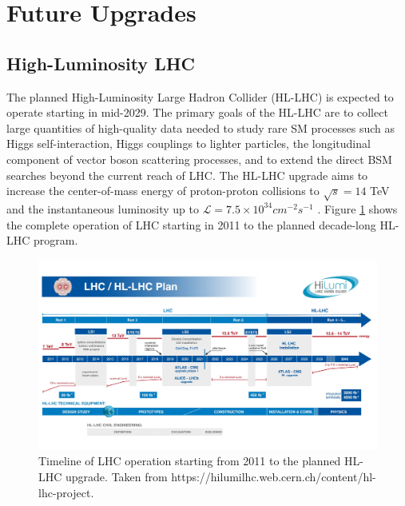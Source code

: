 \section{Future Upgrades}
\label{sec:FutureUpgrades}

\subsection{High-Luminosity LHC}
\label{subsec:HLLHC}
The planned High-Luminosity Large Hadron Collider (HL-LHC) is expected to operate starting in mid-2029. The primary goals of the HL-LHC are to collect large quantities of high-quality data needed to study rare SM processes such as Higgs self-interaction, Higgs couplings to lighter particles, the longitudinal component of vector boson scattering processes, and to extend the direct BSM searches beyond the current reach of LHC. The HL-LHC upgrade aims to increase the center-of-mass energy of proton-proton collisions to $\sqrt{s}=14$ TeV and the instantaneous luminosity up to $\mathcal L = 7.5 \times 10^{34} cm^{-2}s^{-1}$ \cite{HLLHC}. Figure \ref{fig:HLLHC} shows the complete operation of LHC starting in 2011 to the planned decade-long HL-LHC program. 

\begin{figure}[!htb]
    \centering
    \includegraphics[width=.95\linewidth]{figures/LHC/HLLHCPlan.jpeg}
    \caption{ Timeline of LHC operation starting from 2011 to the planned HL-LHC upgrade. Taken from \small{https://hilumilhc.web.cern.ch/content/hl-lhc-project}.\label{fig:HLLHC}}
\end{figure}
\normalsize


